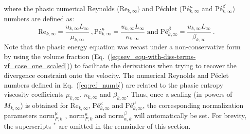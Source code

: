 \documentclass[preprint,10pt]{elsarticle}
\newcommand{\norm}{\textrm{norm}}
\renewcommand{\Re}{\textrm{Re}}
\newcommand{\Pe}{\textrm{P\'e}}
\newcommand{\eqt}[1]{Eq.~(\ref{#1})}                     %
\begin{document}
%
where the phasic numerical Reynolds ($\Re_{k,\infty})$ and P\'echlet ($\Pe_{k,\infty}^\kappa$ and $\Pe_{k,\infty}^\beta$) numbers are defined as:
%
\begin{equation}
\label{eq:ref_numb}
\Re_{k,\infty} = \frac{u_{k,\infty} L_\infty}{\mu_{k,\infty}} \ ,
\Pe_{k,\infty}^\kappa = \frac{u_{k,\infty} L_\infty}{\kappa_{k,\infty}} \text{ and }
\Pe_{k,\infty}^\beta = \frac{u_{k,\infty} L_\infty}{\beta_{k,\infty}} \ .
\end{equation}
%
Note that the phasic energy equation was recast under a non-conservative form by using the volume fraction (\eqt{eq:sev_equ-with-diss-terms-vf_case_one_scaled}) to facilitate the derivations when trying to recover the divergence constraint onto the velocity.
The numerical Reynolds and P\'eclet numbers defined in \eqt{eq:ref_numb} are related to the phasic entropy 
viscosity coefficients $\mu_{k,\infty}$, $\kappa_{k,\infty}$ and $\beta_{k,\infty}$. Thus, once a scaling (in powers of $M_{k,\infty}$) 
is obtained for $\Re_{k,\infty}$, $\Pe_{k,\infty}^\kappa$ and $\Pe_{k,\infty}^\mu$, the corresponding normalization parameters $\norm_{P,k}^\mu$ 
, $\norm_{P,k}^\kappa$ and $\norm_{\alpha,k}^\beta$ will automatically be set. For brevity, the superscripts $^*$ are omitted in the remainder of this section.  
\end{document}
